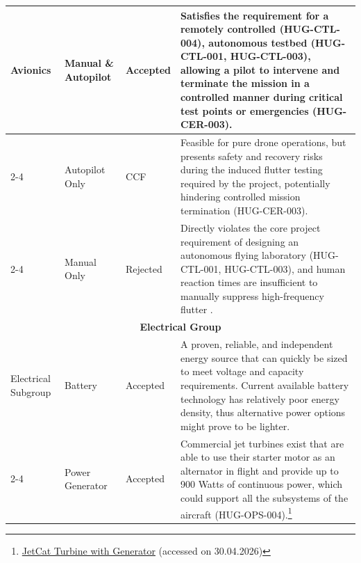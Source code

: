 \begin{longtable}{|p{1.6cm}|p{2.3cm}|p{1.6cm}|p{9.5cm}|}
\hline
Avionics & Manual \& Autopilot & Accepted & Satisfies the requirement for a remotely controlled (HUG-CTL-004), autonomous testbed (HUG-CTL-001, HUG-CTL-003), allowing a pilot to intervene and terminate the mission in a controlled manner during critical test points or emergencies (HUG-CER-003). \\
\cline{2-4}
\multicolumn{1}{|l|}{} & Autopilot Only & CCF & Feasible for pure drone operations, but presents safety and recovery risks during the induced flutter testing required by the project, potentially hindering controlled mission termination (HUG-CER-003). \\
\cline{2-4}
\multicolumn{1}{|l|}{} & Manual Only & Rejected & Directly violates the core project requirement of designing an autonomous flying laboratory (HUG-CTL-001, HUG-CTL-003), and human reaction times are insufficient to manually suppress high-frequency flutter \cite{livne}. \\
\hline
\multicolumn{4}{|c|}{\textbf{Electrical Group}} \\
\hline
Electrical Subgroup & Battery & Accepted & A proven, reliable, and independent energy source that can quickly be sized to meet voltage and capacity requirements. Current available battery technology has relatively poor energy density, thus alternative power options might prove to be lighter.\\
\cline{2-4}
\multicolumn{1}{|l|}{} & Power Generator & Accepted & Commercial jet turbines exist that are able to use their starter motor as an alternator in flight and provide up to 900 Watts of continuous power, which could support all the subsystems of the aircraft (HUG-OPS-004).\footnote{\href{https://www.jetcat.de/en/productdetails/produkte/jetcat/produkte/Professionell/P550\%20PRO-S\%20-\%20GH}{JetCat Turbine with Generator} (accessed on 30.04.2026)} \\
\hline


\end{longtable}
